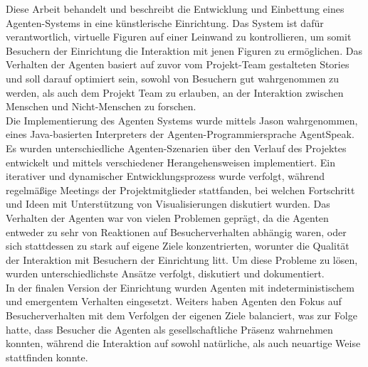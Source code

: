 \documentclass[draft,final]{vutinfth} %
\begin{document}
\begin{kurzfassung}

Diese Arbeit behandelt und beschreibt die Entwicklung und Einbettung eines Agenten-Systems in eine künstlerische Einrichtung. 
Das System ist dafür verantwortlich, virtuelle Figuren auf einer Leinwand zu kontrollieren, um somit Besuchern der Einrichtung die Interaktion mit jenen Figuren zu ermöglichen. 
Das Verhalten der Agenten basiert auf zuvor vom Projekt-Team gestalteten Stories und soll darauf optimiert sein, sowohl von Besuchern gut wahrgenommen zu werden, als auch dem Projekt Team zu erlauben, an der Interaktion zwischen Menschen und Nicht-Menschen zu forschen. \\
Die Implementierung des Agenten Systems wurde mittels Jason wahrgenommen, eines Java-basierten Interpreters der Agenten-Programmiersprache AgentSpeak. 
Es wurden unterschiedliche Agenten-Szenarien über den Verlauf des Projektes entwickelt und mittels verschiedener Herangehensweisen implementiert. 
Ein iterativer und dynamischer Entwicklungsprozess wurde verfolgt, während regelmäßige Meetings der Projektmitglieder stattfanden, bei welchen Fortschritt und Ideen mit Unterstützung von Visualisierungen diskutiert wurden. 
Das Verhalten der Agenten war von vielen Problemen geprägt, da die Agenten entweder zu sehr von Reaktionen auf Besucherverhalten abhängig waren, oder sich stattdessen zu stark auf eigene Ziele konzentrierten, worunter die Qualität der Interaktion mit Besuchern der Einrichtung litt. 
Um diese Probleme zu lösen, wurden unterschiedlichste Ansätze verfolgt, diskutiert und dokumentiert.\\
In der finalen Version der Einrichtung wurden Agenten mit indeterministischem und emergentem Verhalten eingesetzt. 
Weiters haben Agenten den Fokus auf Besucherverhalten mit dem Verfolgen der eigenen Ziele balanciert, was zur Folge hatte, dass Besucher die Agenten als gesellschaftliche Präsenz wahrnehmen konnten, während die Interaktion auf sowohl natürliche, als auch neuartige Weise stattfinden konnte.

\end{kurzfassung}
\end{document}
